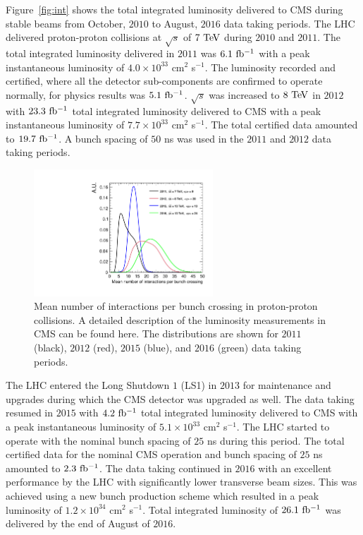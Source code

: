 Figure~\ref{fig:int} shows the total integrated luminosity delivered to CMS during stable beams from October, $2010$ to August, $2016$ data taking periods. The LHC delivered proton-proton collisions at $\sqrt{s}$ of $7~\mathrm{Te\kern -0.1em V}$ during $2010$ and $2011$. The total integrated luminosity delivered in $2011$ was $6.1~\mathrm{fb^{-1}}$ with a peak instantaneous luminosity of $4.0 \times 10^{33}$ cm$^2$ s$^{-1}$. The luminosity recorded and certified, where all the detector sub-components are confirmed to operate normally, for physics results was $5.1~\mathrm{fb^{-1}}$. $\sqrt{s}$ was increased to $8~\mathrm{Te\kern -0.1em V}$ in $2012$ with $23.3~\mathrm{fb^{-1}}$ total integrated luminosity delivered to CMS with a peak instantaneous luminosity of $7.7 \times 10^{33}$ cm$^2$ s$^{-1}$. The total certified data amounted to $19.7~\mathrm{fb^{-1}}$. A bunch spacing of $50$ ns was used in the $2011$ and $2012$ data taking periods. 

 \begin{figure}[h]
\centering
\includegraphics[width=0.6\textwidth]{figures_chapter2/pileup_cms}
\caption{Mean number of interactions per bunch crossing in proton-proton collisions. A detailed description of the  luminosity measurements in CMS can be found here\cite{CMS-PAS-LUM-13-001,CMS-PAS-LUM-15-001}. The distributions are shown for $2011$ (black), $2012$ (red), $2015$ (blue), and $2016$ (green) data taking periods.}
\label{fig:pu}
\end{figure} 

The LHC entered the Long Shutdown $1$ (LS1) in $2013$ for maintenance and upgrades during which the CMS detector was upgraded as well. The data taking resumed in $2015$ with $4.2~\mathrm{fb^{-1}}$ total integrated luminosity delivered to CMS with a peak instantaneous luminosity of $5.1 \times 10^{33}$ cm$^2$ s$^{-1}$. The LHC started to operate with the nominal bunch spacing of $25$ ns during this period. The total certified data for the nominal CMS operation and bunch spacing of $25$ ns amounted to $2.3~\mathrm{fb^{-1}}$. The data taking continued in $2016$ with an excellent performance by the LHC with significantly lower transverse beam sizes. This was achieved using a new bunch production scheme which resulted in a peak luminosity of  $1.2 \times 10^{34}$ cm$^2$ s$^{-1}$. Total integrated luminosity of $26.1~\mathrm{fb^{-1}}$ was delivered by the end of August of $2016$.   

